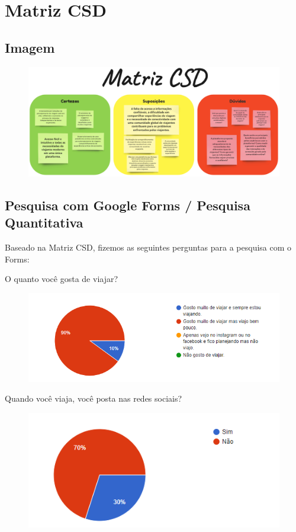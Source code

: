 \documentclass{article}
\begin{document}
\section{Matriz CSD}
 {\subsection{Imagem}}

\begin{figure}[H]
      \centering
      \includegraphics [width=1\textwidth]{IMGDOC/Matriz CSD.png}
      \label{csd imagem}
\end{figure}

{\subsection{Pesquisa com Google Forms / Pesquisa Quantitativa}}
Baseado na Matriz CSD, fizemos as seguintes perguntas para a pesquisa com o Forms:
\bigskip

O quanto você gosta de viajar?
\begin{figure}[H]
      \centering
      \includegraphics [width=1\textwidth]{IMGDOC/Quanto Gosta.png}
      \label{Pesquisa1}
\end{figure}

Quando você viaja, você posta nas redes sociais?
\begin{figure}[H]
      \centering
      \includegraphics [width=1\textwidth]{IMGDOC/Redes sociais.png}
      \label{Pesquisa2}
\end{figure}
\end{document}
